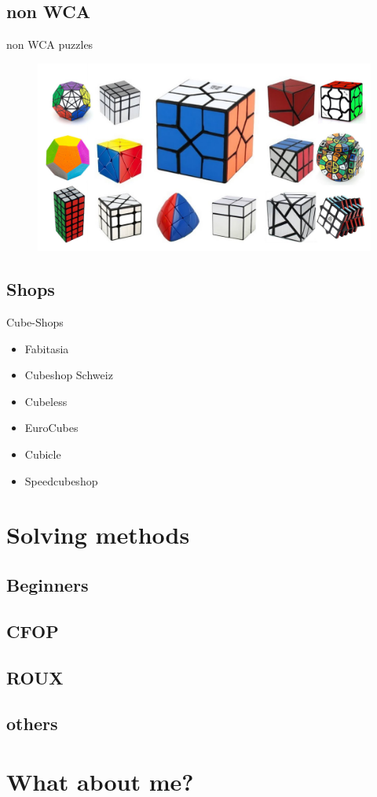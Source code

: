 \documentclass{beamer}
\begin{document}
        \subsection{non WCA}
            \begin{frame}{non WCA puzzles}
                \begin{figure}
                    \includegraphics[width=\textwidth]{assets/nonWCAall.jpg}
                \end{figure}
            \end{frame}
        \subsection{Shops}
            \begin{frame}{Cube-Shops}
                \begin{itemize}
                    \item Fabitasia
                    \item Cubeshop Schweiz
                    \item Cubeless
                    \item EuroCubes
                    \item Cubicle
                    \item Speedcubeshop
                \end{itemize}
            \end{frame}
        
    \section{Solving methods}
        \subsection{Beginners}
        \subsection{CFOP}
        \subsection{ROUX}
        \subsection{others}
    \section{What about me?}
\end{document}
